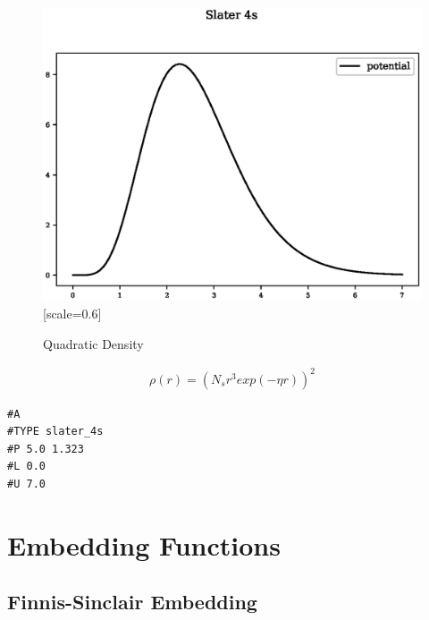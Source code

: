 \documentclass[12pt,twoside]{manual}
\begin{document}
\begin{appendices}
\begin{figure}[h]
  \begin{center}
    \includegraphics{img/plots/slater_4s.eps}[scale=0.6]
    \caption{Quadratic Density}
    \label{graph:graph1}
  \end{center}
\end{figure}

\begin{equation}
\begin{split}
\rho(r) = (N_s r^3 exp(-\eta r))^2 
\end{split}
\label{eq:slater4S}
\end{equation}

\begin{lstlisting}[style=pseudocode,caption={Slater 4S}]
#A
#TYPE slater_4s
#P 5.0 1.323
#L 0.0
#U 7.0
\end{lstlisting}








\section{Embedding Functions}

\subsection{Finnis-Sinclair Embedding}


\end{appendices}
\end{document}
